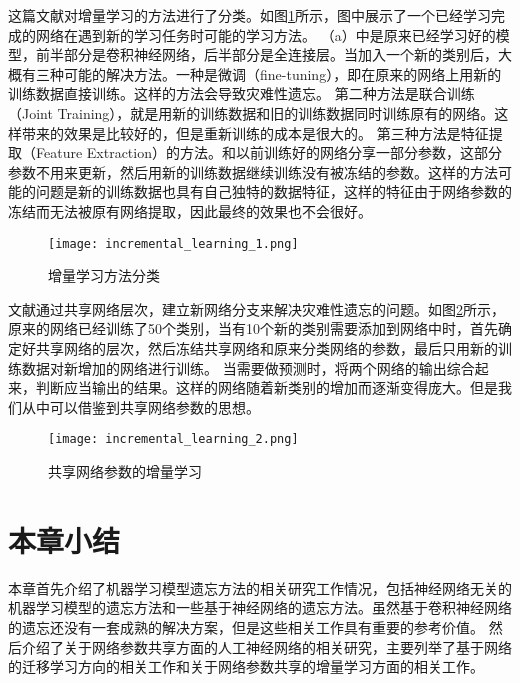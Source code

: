 这篇文献\cite{8107520}对增量学习的方法进行了分类。如图\ref{fig:incremental_learning_1}所示，图中展示了一个已经学习完成的网络在遇到新的学习任务时可能的学习方法。
（a）中是原来已经学习好的模型，前半部分是卷积神经网络，后半部分是全连接层。当加入一个新的类别后，大概有三种可能的解决方法。一种是微调（fine-tuning），即在原来的网络上用新的训练数据直接训练。这样的方法会导致灾难性遗忘。
第二种方法是联合训练（Joint Training），就是用新的训练数据和旧的训练数据同时训练原有的网络。这样带来的效果是比较好的，但是重新训练的成本是很大的。
第三种方法是特征提取（Feature Extraction）的方法。和以前训练好的网络分享一部分参数，这部分参数不用来更新，然后用新的训练数据继续训练没有被冻结的参数。这样的方法可能的问题是新的训练数据也具有自己独特的数据特征，这样的特征由于网络参数的冻结而无法被原有网络提取，因此最终的效果也不会很好。
\begin{figure}
    \centering
    \texttt{[image: incremental\_learning\_1.png]}
    \caption{增量学习方法分类\cite{8107520}}
    \label{fig:incremental_learning_1}
\end{figure}

文献\cite{Sarwar_2020}通过共享网络层次，建立新网络分支来解决灾难性遗忘的问题。如图\ref{fig:incremental_learning_2}所示，原来的网络已经训练了50个类别，当有10个新的类别需要添加到网络中时，首先确定好共享网络的层次，然后冻结共享网络和原来分类网络的参数，最后只用新的训练数据对新增加的网络进行训练。
当需要做预测时，将两个网络的输出综合起来，判断应当输出的结果。这样的网络随着新类别的增加而逐渐变得庞大。但是我们从中可以借鉴到共享网络参数的思想。
\begin{figure}
    \centering
    \texttt{[image: incremental\_learning\_2.png]}
    \caption{共享网络参数的增量学习\cite{Sarwar_2020}}
    \label{fig:incremental_learning_2}
\end{figure}


\section{本章小结}
本章首先介绍了机器学习模型遗忘方法的相关研究工作情况，包括神经网络无关的机器学习模型的遗忘方法和一些基于神经网络的遗忘方法。虽然基于卷积神经网络的遗忘还没有一套成熟的解决方案，但是这些相关工作具有重要的参考价值。
然后介绍了关于网络参数共享方面的人工神经网络的相关研究，主要列举了基于网络的迁移学习方向的相关工作和关于网络参数共享的增量学习方面的相关工作。